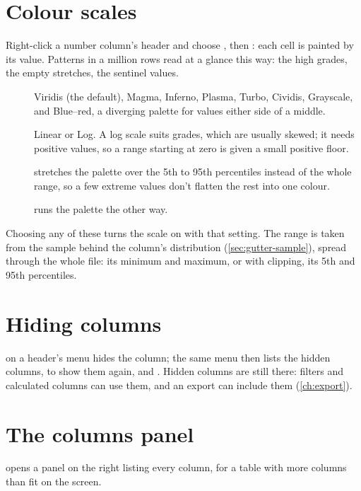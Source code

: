 \section{Colour scales}\label{sec:colour-scales}

Right-click a number column's header and choose , then : each cell is painted by
its value. Patterns in a million rows read at a glance this way: the high grades, the empty stretches,
the sentinel values.

\begin{description}
\item[] Viridis (the default), Magma, Inferno, Plasma, Turbo, Cividis, Grayscale, and
Blue–red, a diverging palette for values either side of a middle.
\item[] Linear or Log. A log scale suits grades, which are usually skewed; it needs positive
values, so a range starting at zero is given a small positive floor.
\item[] stretches the palette over the 5th to 95th percentiles instead of the
whole range, so a few extreme values don't flatten the rest into one colour.
\item[] runs the palette the other way.
\end{description}

Choosing any of these turns the scale on with that setting. The range is taken from the sample behind
the column's distribution (\cref{sec:gutter-sample}), spread through the whole file: its minimum and
maximum, or with clipping, its 5th and 95th percentiles.

\section{Hiding columns}

 on a header's menu hides the column; the same menu then lists the hidden columns, to show
them again, and . Hidden columns are still there: filters and calculated columns
can use them, and an export can include them (\cref{ch:export}).

\section{The columns panel}\label{sec:columns-panel}

 opens a panel on the right listing every column, for a table with more columns than
fit on the screen.

